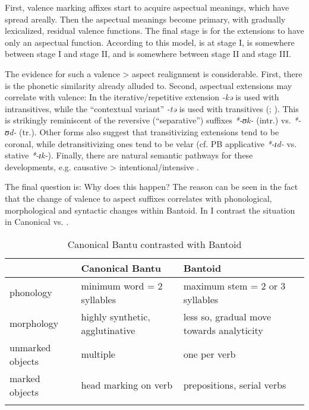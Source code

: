 \documentclass[output=paper]{langsci/langscibook}
\begin{document}
First, valence marking affixes start to acquire aspectual meanings, which have spread areally. Then the aspectual meanings become primary, with gradually lexicalized, residual valence functions. The final stage is for the extensions to have only an aspectual function. According to this model,  is at stage I,  is somewhere between stage I and stage II, and  is somewhere between stage II and stage III.

The evidence for such a valence > aspect realignment is considerable. First, there is the phonetic similarity already alluded to. Second, aspectual extensions may correlate with valence: In  the iterative/repetitive extension \textit{-kə} is used with intransitives, while the “contextual variant” \textit{-tə} is used with transitives (\citealt[22]{TamanjiMba2003}; \citealt[99]{Bila1986}). This is strikingly reminiscent of the  reversive (“separative”) suffixes \textit{*-ʊk-} (intr.) vs. \textit{*-ʊd-} (tr.). Other forms also suggest that transitivizing extensions tend to be coronal, while detransitivizing ones tend to be velar (cf. PB applicative \textit{*-ɪd-} vs. stative \textit{*-ɪk-}). Finally, there are natural semantic pathways for these developments, e.g. causative > intentional/intensive \citep{Kiessling2004}.

The final question is: Why does this happen? The reason can be seen in the fact that the change of valence to aspect suffixes correlates with phonological, morphological and syntactic changes within Bantoid. In  I contrast the situation in Canonical  vs. .

\begin{table}
\begin{tabularx}{\textwidth}{lQQ}
\lsptoprule
          & {Canonical Bantu} & {Bantoid}\\
\midrule
{phonology} & minimum word = 2 syllables & maximum stem = 2 or 3 syllables\\
\tablevspace
{morphology} & highly synthetic, agglutinative & less so, gradual move towards analyticity\\
\tablevspace
{unmarked objects} & multiple & one per verb\\
\tablevspace
{marked objects} & head marking on verb & prepositions, serial verbs\\
\lspbottomrule
\end{tabularx}
\caption{Canonical Bantu contrasted with Bantoid}
\label{extab:proto:26}
\end{table}
\end{document}
